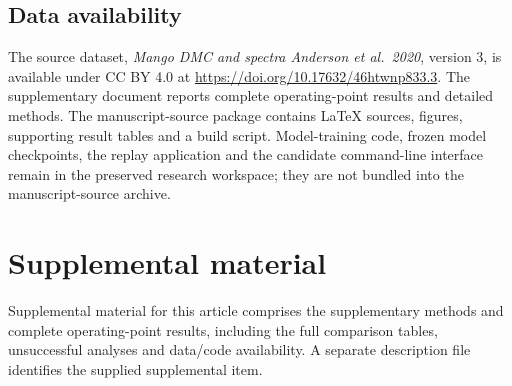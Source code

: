 \subsection*{Data availability}
The source dataset, \emph{Mango DMC and spectra Anderson et al.\ 2020}, version 3, is available under CC BY 4.0 at \url{https://doi.org/10.17632/46htwnp833.3}. The supplementary document reports complete operating-point results and detailed methods. The manuscript-source package contains LaTeX sources, figures, supporting result tables and a build script. Model-training code, frozen model checkpoints, the replay application and the candidate command-line interface remain in the preserved research workspace; they are not bundled into the manuscript-source archive. \SoftwareAccessStatement

\section*{Supplemental material}
Supplemental material for this article comprises the supplementary methods and complete operating-point results, including the full comparison tables, unsuccessful analyses and data/code availability. A separate description file identifies the supplied supplemental item.
